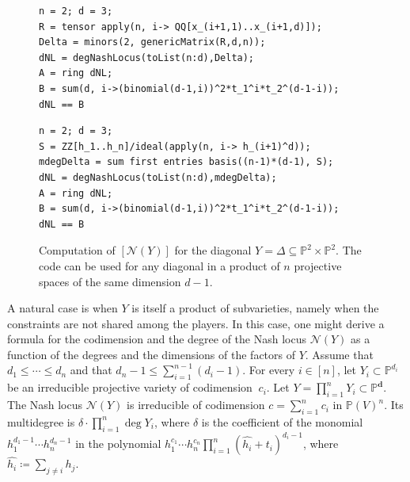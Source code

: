 \documentclass[12pt]{article}
\theoremstyle{definition}
\newenvironment{example}
{\pushQED{\qed}\renewcommand{\qedsymbol}{$\diamond$}\examplex}
{\popQED\endexamplex}
\newcommand{\PP}{{\mathbb P}}
\def\bd{{\boldsymbol{d}}}
\newcommand{\kn}{{\mathcal N}}
\begin{document}
\begin{figure}[h]
\centering
\begin{minipage}{0.49\textwidth}
\begin{tcolorbox}[size=fbox,width=\linewidth,colback=blue!5!white,colframe=blue!75!black]
\begin{Verbatim}[fontsize=\scriptsize,commandchars=\\\{\}]
n = 2; d = 3;
R = tensor apply(n, i-> QQ[x_(i+1,1)..x_(i+1,d)]);
Delta = minors(2, genericMatrix(R,d,n));
dNL = degNashLocus(toList(n:d),Delta);
A = ring dNL;
B = sum(d, i->(binomial(d-1,i))^2*t_1^i*t_2^(d-1-i));
dNL == B
\end{Verbatim}
\end{tcolorbox}
\end{minipage}
\begin{minipage}{0.49\textwidth}
\begin{tcolorbox}[size=fbox,width=\linewidth,colback=blue!5!white,colframe=blue!75!black]
\begin{Verbatim}[fontsize=\scriptsize,commandchars=\\\{\}]
n = 2; d = 3;
S = ZZ[h_1..h_n]/ideal(apply(n, i-> h_(i+1)^d));
mdegDelta = sum first entries basis((n-1)*(d-1), S);
dNL = degNashLocus(toList(n:d),mdegDelta);
A = ring dNL;
B = sum(d, i->(binomial(d-1,i))^2*t_1^i*t_2^(d-1-i));
dNL == B
\end{Verbatim}
\end{tcolorbox}
\end{minipage}
\caption{Computation of $[\kn(Y)]$ for the diagonal $Y=\Delta\subseteq\PP^2\times\PP^2$. The code can be used for any diagonal in a product of $n$ projective spaces of the same dimension $d-1$.}\label{fig: degNashLocus diagonal}
\end{figure}

\begin{example}\label{ex: Y splits}
A natural case is when $Y$ is itself a product of subvarieties, namely when the constraints are not shared among the players.
In this case, one might derive a formula for the codimension and the degree of the Nash locus $\kn(Y)$ as a function of the degrees and the dimensions of the factors of $Y$.
Assume that $d_1\le\cdots\le d_n$ and that $d_n-1\le\sum_{i=1}^{n-1}(d_i-1)$. For every $i\in[n]$, let $Y_i\subset\PP^{d_i}$
be an irreducible projective variety of codimension $\
c_i$. Let $Y=\prod_{i=1}^n Y_i\subset\PP^\bd$.
The Nash locus $\kn(Y)$ is irreducible of codimension $c=\sum_{i=1}^nc_i$ in $\PP(V)^{n}$. Its multidegree is $\delta\cdot\prod_{i=1}^n\deg Y_i$, where $\delta$ is the coefficient of the monomial $h_1^{d_1-1}\cdots h_n^{d_n-1}$ in the polynomial $h_1^{c_1}\cdots h_n^{c_n}\prod_{i=1}^{n}(\widehat{h_i}+t_i)^{d_i-1}$, where $\widehat{h_i}\coloneqq\sum_{j\neq i}h_j$.
\end{example}
\end{document}
